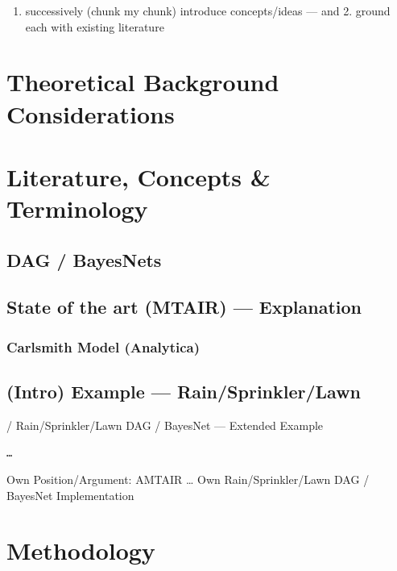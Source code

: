 \documentclass[
  letterpaper,
]{book}
\providecommand{\tightlist}{%
  \setlength{\itemsep}{0pt}\setlength{\parskip}{0pt}}
\begin{document}
\begin{enumerate}
\def\labelenumi{\arabic{enumi}.}
\tightlist
\item
  successively (chunk my chunk) introduce concepts/ideas --- and 2.
  ground each with existing literature
\end{enumerate}

\section{Theoretical Background
Considerations}\label{theoretical-background-considerations}

\section{Literature, Concepts \&
Terminology}\label{literature-concepts-terminology}

\subsection{DAG / BayesNets}\label{dag-bayesnets}

\subsection{State of the art (MTAIR) ---
Explanation}\label{state-of-the-art-mtair-explanation}

\subsubsection{Carlsmith Model
(Analytica)}\label{carlsmith-model-analytica}

\subsection{(Intro) Example ---
Rain/Sprinkler/Lawn}\label{intro-example-rainsprinklerlawn}

/ Rain/Sprinkler/Lawn DAG / BayesNet --- Extended Example

\begin{verbatim}
…
\end{verbatim}

Own Position/Argument: AMTAIR \ldots{} Own Rain/Sprinkler/Lawn DAG /
BayesNet Implementation

\section{Methodology}\label{methodology}
\end{document}

